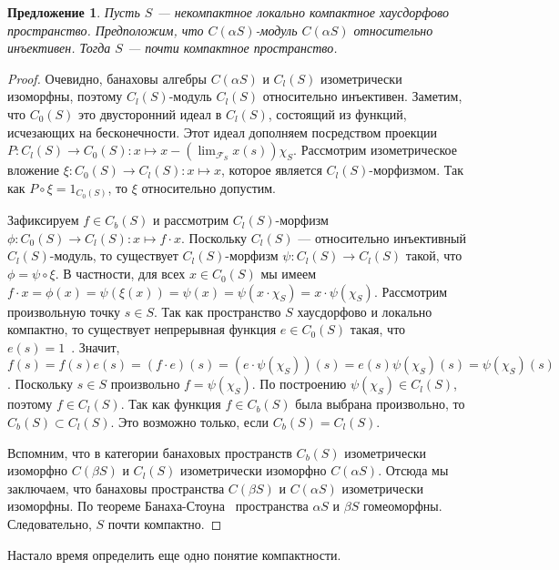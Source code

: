 \documentclass[12pt]{article}
\newtheorem{proposition}[theorem]{Предложение}
\begin{document}
\begin{proposition}\label{RelInjCaSModCaSImplSAlmComp} Пусть $S$ ---
    некомпактное локально компактное хаусдорфово пространство. Предположим, что
    $C(\alpha S)$-модуль $C(\alpha S)$ относительно инъективен. Тогда $S$ ---
    почти компактное пространство.
\end{proposition}
\begin{proof} Очевидно, банаховы алгебры $C(\alpha S)$ и $C_l(S)$ изометрически
    изоморфны, поэтому $C_l(S)$-модуль $C_l(S)$ относительно инъективен.
    Заметим, что $C_0(S)$ это двусторонний идеал в $C_l(S)$, состоящий из
    функций, исчезающих на бесконечности. Этот идеал дополняем посредством
    проекции $P:C_l(S)\to C_0(S):x\mapsto x-(\lim_{\mathcal{F}_S}x(s))\chi_{S}$.
    Рассмотрим изометрическое вложение $\xi:C_0(S)\to C_l(S):x\mapsto x$,
    которое является $C_l(S)$-морфизмом. Так как $P\circ\xi=1_{C_0(S)}$, то
    $\xi$ относительно допустим.

    Зафиксируем $f \in C_b(S)$ и рассмотрим $C_l(S)$-морфизм $\phi:C_0(S)\to
        C_l(S):x\mapsto f \cdot x$. Поскольку $C_l(S)$  --- относительно
    инъективный $C_l(S)$-модуль, то существует $C_l(S)$-морфизм
    $\psi:C_l(S)\to C_l(S)$ такой, что $\phi=\psi\circ\xi$. В частности, для
    всех $x\in C_0(S)$ мы имеем $f\cdot
        x=\phi(x)=\psi(\xi(x))=\psi(x)=\psi(x\cdot \chi_{S})=x\cdot
        \psi(\chi_{S})$. Рассмотрим произвольную точку $s\in S$. Так как
    пространство $S$ хаусдорфово и локально компактно, то существует
    непрерывная функция $e\in C_0(S)$ такая, что $e(s)=1$~\cite[следствие
        3.3.3]{EngkingGenTop}. Значит, $f(s)=f(s)e(s)=(f\cdot
        e)(s)=(e\cdot\psi(\chi_{S}))(s)=e(s)\psi(\chi_{S})(s)=\psi(\chi_{S})(s)$.
    Поскольку $s\in S$ произвольно $f=\psi(\chi_{S})$. По построению
    $\psi(\chi_S)\in C_l(S)$, поэтому $f\in C_l(S)$. Так как функция $f\in
        C_b(S)$ была выбрана произвольно, то $C_b(S)\subset C_l(S)$. Это
    возможно только, если $C_b(S)=C_l(S)$.

    Вспомним, что в категории банаховых пространств $C_b(S)$ изометрически
    изоморфно $C(\beta S)$ и $C_l(S)$ изометрически изоморфно $C(\alpha S)$.
    Отсюда мы заключаем, что банаховы пространства $C(\beta S)$ и $C(\alpha S)$
    изометрически изоморфны. По теореме Банаха-Стоуна~\cite[теорема
        83]{StoneBanStAppBoolRngToTop} пространства $\alpha S$ и $\beta S$
    гомеоморфны. Следовательно, $S$ почти компактно.
\end{proof}

Настало время определить еще одно понятие компактности.
\end{document}
